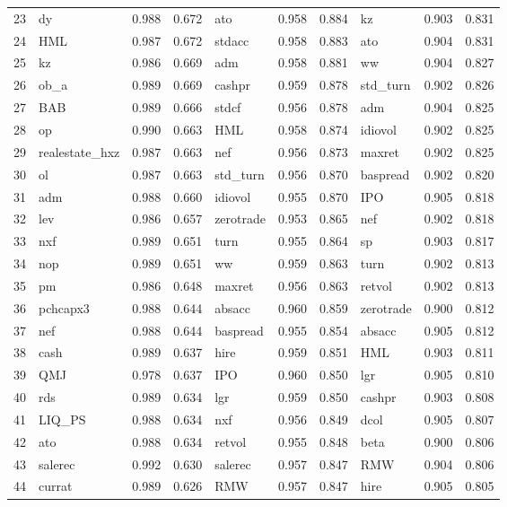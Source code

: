 \documentclass[12pt]{article}
\begin{document}
\begin{landscape}
\begin{footnotesize}
\begin{longtable}{l|lcc|lcc|lcc}
  23 & dy & 0.988 & 0.672 & ato & 0.958 & 0.884 & kz & 0.903 & 0.831 \\ 
  24 & HML & 0.987 & 0.672 & stdacc & 0.958 & 0.883 & ato & 0.904 & 0.831 \\ 
  25 & kz & 0.986 & 0.669 & adm & 0.958 & 0.881 & ww & 0.904 & 0.827 \\ 
  26 & ob\_a & 0.989 & 0.669 & cashpr & 0.959 & 0.878 & std\_turn & 0.902 & 0.826 \\ 
  27 & BAB & 0.989 & 0.666 & stdcf & 0.956 & 0.878 & adm & 0.904 & 0.825 \\ 
  28 & op & 0.990 & 0.663 & HML & 0.958 & 0.874 & idiovol & 0.902 & 0.825 \\ 
  29 & realestate\_hxz & 0.987 & 0.663 & nef & 0.956 & 0.873 & maxret & 0.902 & 0.825 \\ 
  30 & ol & 0.987 & 0.663 & std\_turn & 0.956 & 0.870 & baspread & 0.902 & 0.820 \\ 
  31 & adm & 0.988 & 0.660 & idiovol & 0.955 & 0.870 & IPO & 0.905 & 0.818 \\ 
  32 & lev & 0.986 & 0.657 & zerotrade & 0.953 & 0.865 & nef & 0.902 & 0.818 \\ 
  33 & nxf & 0.989 & 0.651 & turn & 0.955 & 0.864 & sp & 0.903 & 0.817 \\ 
  34 & nop & 0.989 & 0.651 & ww & 0.959 & 0.863 & turn & 0.902 & 0.813 \\ 
  35 & pm & 0.986 & 0.648 & maxret & 0.956 & 0.863 & retvol & 0.902 & 0.813 \\ 
  36 & pchcapx3 & 0.988 & 0.644 & absacc & 0.960 & 0.859 & zerotrade & 0.900 & 0.812 \\ 
  37 & nef & 0.988 & 0.644 & baspread & 0.955 & 0.854 & absacc & 0.905 & 0.812 \\ 
  38 & cash & 0.989 & 0.637 & hire & 0.959 & 0.851 & HML & 0.903 & 0.811 \\ 
  39 & QMJ & 0.978 & 0.637 & IPO & 0.960 & 0.850 & lgr & 0.905 & 0.810 \\ 
  40 & rds & 0.989 & 0.634 & lgr & 0.959 & 0.850 & cashpr & 0.903 & 0.808 \\ 
  41 & LIQ\_PS & 0.988 & 0.634 & nxf & 0.956 & 0.849 & dcol & 0.905 & 0.807 \\ 
  42 & ato & 0.988 & 0.634 & retvol & 0.955 & 0.848 & beta & 0.900 & 0.806 \\ 
  43 & salerec & 0.992 & 0.630 & salerec & 0.957 & 0.847 & RMW & 0.904 & 0.806 \\ 
  44 & currat & 0.989 & 0.626 & RMW & 0.957 & 0.847 & hire & 0.905 & 0.805 \\ 

\end{longtable}
\end{footnotesize}
\end{landscape}
\end{document}
